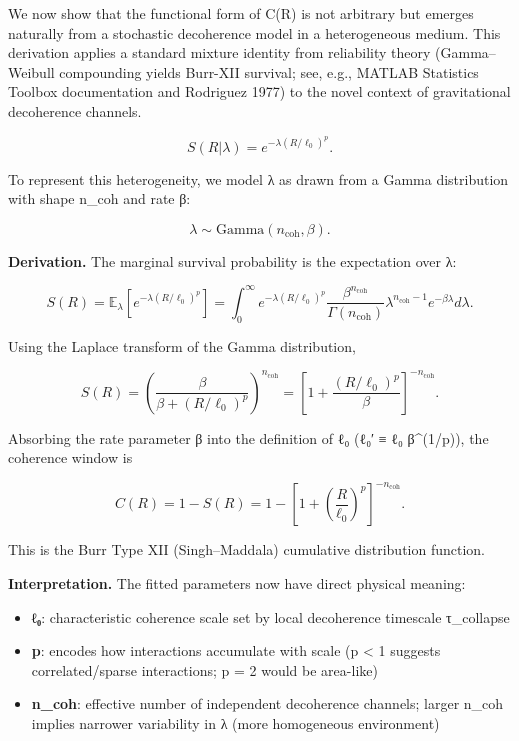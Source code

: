 \documentclass[11pt,a4paper]{article}
\begin{document}
We now show that the functional form of C(R) is not arbitrary but emerges naturally from a stochastic decoherence model in a heterogeneous medium. This derivation applies a standard mixture identity from reliability theory (Gamma–Weibull compounding yields Burr-XII survival; see, e.g., MATLAB Statistics Toolbox documentation and Rodriguez 1977) to the novel context of gravitational decoherence channels.



\begin{equation}
S(R|\lambda) = e^{-\lambda(R/\ell_0)^p}.
\end{equation}


To represent this heterogeneity, we model λ as drawn from a Gamma distribution with shape n\_coh and rate β:


\begin{equation}
\lambda \sim \mathrm{Gamma}(n_{\mathrm{coh}}, \beta).
\end{equation}


\textbf{Derivation.} The marginal survival probability is the expectation over λ:


\begin{equation}
S(R) = \mathbb{E}_{\lambda}\left[e^{-\lambda(R/\ell_0)^p}\right] = \int_0^\infty e^{-\lambda(R/\ell_0)^p} \frac{\beta^{n_{\mathrm{coh}}}}{\Gamma(n_{\mathrm{coh}})} \lambda^{n_{\mathrm{coh}}-1} e^{-\beta\lambda} d\lambda.
\end{equation}


Using the Laplace transform of the Gamma distribution,


\begin{equation}
S(R) = \left(\frac{\beta}{\beta + (R/\ell_0)^p}\right)^{n_{\mathrm{coh}}} = \left[1 + \frac{(R/\ell_0)^p}{\beta}\right]^{-n_{\mathrm{coh}}}.
\end{equation}


Absorbing the rate parameter β into the definition of ℓ₀ (ℓ₀′ ≡ ℓ₀ β^(1/p)), the coherence window is


\begin{equation}
C(R) = 1 - S(R) = 1 - \left[1 + \left(\frac{R}{\ell_0}\right)^p\right]^{-n_{\mathrm{coh}}}.
\end{equation}


This is the Burr Type XII (Singh–Maddala) cumulative distribution function.


\textbf{Interpretation.} The fitted parameters now have direct physical meaning:  

\begin{itemize}
\item \textbf{ℓ₀}: characteristic coherence scale set by local decoherence timescale τ\_collapse
\item \textbf{p}: encodes how interactions accumulate with scale (p < 1 suggests correlated/sparse interactions; p = 2 would be area-like)
\item \textbf{n\_coh}: effective number of independent decoherence channels; larger n\_coh implies narrower variability in λ (more homogeneous environment)
\end{itemize}
\end{document}
